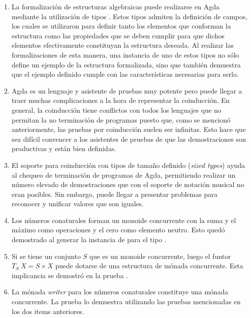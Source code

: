 \begin{enumerate}
\item La formalización de estructuras algebraicas puede realizarse en Agda mediante la utilización de tipos . Estos tipos admiten la definición de campos, los cuales se utilizaron para definir tanto los elementos que conforman la estructura como las propiedades que se deben cumplir para que dichos elementos efectivamente constituyan la estructura deseada. Al realizar las formalizaciones de esta manera, una instancia de uno de estos tipos no sólo define un ejemplo de la estructura formalizada, sino que también demuestra que el ejemplo definido cumple con las características necesarias para serlo. 

\item Agda es un lenguaje y asistente de pruebas muy potente pero puede llegar a traer muchas complicaciones a la hora de representar la coinducción. En general, la coinducción tiene conflictos con todos los lenguajes que no permitan la no terminación de programas puesto que, como se mencionó anteriormente, las pruebas por coinducción suelen ser infinitas. Esto hace que sea difícil convencer a los asistentes de pruebas de que las demostraciones son productivas y están bien definidas. 

\item El soporte para coinducción con tipos de tamaño definido (\textit{sized types}) ayuda al chequeo de terminación de programas de Agda, permitiendo realizar un número elevado de demostraciones que con el soporte de notación musical no eran posibles. Sin embargo, puede llegar a presentar problemas para reconocer y unificar valores que son iguales. 

\item Los números conaturales forman un monoide concurrente con la suma y el máximo como operaciones y el cero como elemento neutro. Esto quedó demostrado al generar la instancia de  para el tipo .

\item Si se tiene un conjunto $S$ que es un monoide concurrente, luego el funtor $\mathit{T}_S \ X = S \times X$ puede dotarse de una estructura de mónada concurrente. Esta implicancia se demostró en la prueba . 

\item La mónada \textit{writer} para los números conaturales constituye una mónada concurrente. La prueba  lo demuestra utilizando las pruebas mencionadas en los dos items anteriores. 
\end{enumerate}

